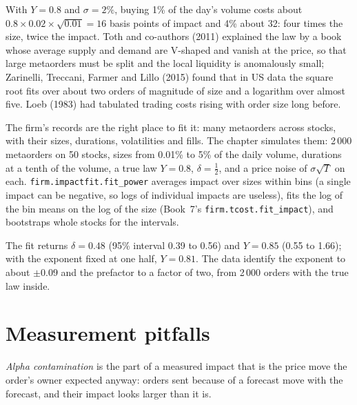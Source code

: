 With $Y=0.8$ and $\sigma=2\%$, buying 1\% of the day's volume costs about $0.8\times0.02\times\sqrt{0.01}=16$ basis points of impact and 4\% about 32: four
times the size, twice the impact. Toth and co-authors (2011) explained the law by a book whose average supply and demand are V-shaped and vanish at the
price, so that large metaorders must be split and the local liquidity is anomalously small; Zarinelli, Treccani, Farmer and Lillo (2015) found that in US
data the square root fits over about two orders of magnitude of size and a logarithm over almost five. Loeb (1983) had tabulated trading costs rising
with order size long before.

The firm's records are the right place to fit it: many metaorders across stocks, with their sizes, durations, volatilities and fills. The chapter
simulates them: 2\,000 metaorders on 50 stocks, sizes from 0.01\% to 5\% of the daily volume, durations at a tenth of the volume, a true law $Y=0.8$,
$\delta=\tfrac12$, and a price noise of $\sigma\sqrt T$ on each. \texttt{firm.impactfit.fit\_power} averages impact over sizes within bins (a single
impact can be negative, so logs of individual impacts are useless), fits the log of the bin means on the log of the size (Book~7's
\texttt{firm.tcost.fit\_impact}), and bootstraps whole stocks for the intervals.

\label{lst:mx:the-empirics-of-price-impact:fit}

The fit returns $\delta=0.48$ (95\% interval 0.39 to 0.56) and $Y=0.85$ (0.55 to 1.66); with the exponent fixed at one half, $Y=0.81$. The data identify the
exponent to about $\pm0.09$ and the prefactor to a factor of two, from 2\,000 orders with the true law inside.

\section{Measurement pitfalls}

\begin{definition}\label{def:mx:the-empirics-of-price-impact:alpha}
\emph{Alpha contamination} is the part of a measured impact that is the price move the order's owner expected anyway: orders
sent because of a forecast move with the forecast, and their impact looks larger than it is.
\end{definition}

